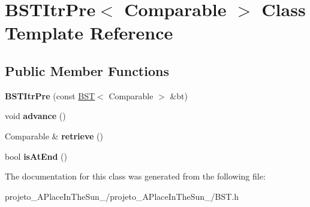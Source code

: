 \hypertarget{class_b_s_t_itr_pre}{}\section{B\+S\+T\+Itr\+Pre$<$ Comparable $>$ Class Template Reference}
\label{class_b_s_t_itr_pre}
\subsection*{Public Member Functions}
\begin{DoxyCompactItemize}
\item 
\hypertarget{class_b_s_t_itr_pre_a11b1cd4e783f153b9c1b64ce2ec8077e}{}\label{class_b_s_t_itr_pre_a11b1cd4e783f153b9c1b64ce2ec8077e} 
{\bfseries B\+S\+T\+Itr\+Pre} (const \hyperlink{class_b_s_t}{B\+ST}$<$ Comparable $>$ \&bt)
\item 
\hypertarget{class_b_s_t_itr_pre_a7a743d66a842018fd833fb2b0737254d}{}\label{class_b_s_t_itr_pre_a7a743d66a842018fd833fb2b0737254d} 
void {\bfseries advance} ()
\item 
\hypertarget{class_b_s_t_itr_pre_af40033e97f63bf025c2e33a9fdce4c43}{}\label{class_b_s_t_itr_pre_af40033e97f63bf025c2e33a9fdce4c43} 
Comparable \& {\bfseries retrieve} ()
\item 
\hypertarget{class_b_s_t_itr_pre_ae282a7b9ffa9d250bb0f6a6d79f6e8d0}{}\label{class_b_s_t_itr_pre_ae282a7b9ffa9d250bb0f6a6d79f6e8d0} 
bool {\bfseries is\+At\+End} ()
\end{DoxyCompactItemize}


The documentation for this class was generated from the following file\+:\begin{DoxyCompactItemize}
\item 
projeto\+\_\+\+A\+Place\+In\+The\+Sun\+\_/projeto\+\_\+\+A\+Place\+In\+The\+Sun\+\_/B\+S\+T.\+h\end{DoxyCompactItemize}
